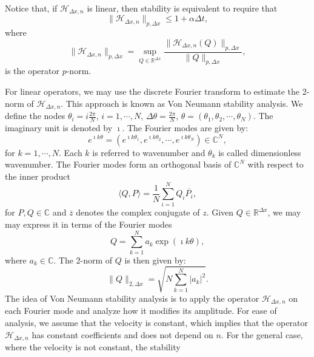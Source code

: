 Notice that, if $\mathcal{H}_{\Delta x,n}$ is linear, then stability is equivalent to require that
\begin{equation*}
	\|\mathcal{H}_{\Delta x,n}\|_{p,\Delta x} \leq 1+ \alpha \Delta t,
\end{equation*}
where
\begin{equation*}
	\|\mathcal{H}_{\Delta x,n}\|_{p,\Delta x} = \sup_{Q\in \mathbb{R}^{\Delta x}} \frac{\|\mathcal{H}_{\Delta x,n}(Q)\|_{p,\Delta x}}{\|Q\|_{p,\Delta x}},
\end{equation*}
is the operator $p$-norm.

For linear operators, we may use the discrete Fourier transform \citep{trefethen:2000}
to estimate the 2-norm of $\mathcal{H}_{\Delta x,n}$. This approach is known as Von Neumann stability analysis.
We define the nodes $\theta_i = i\frac{2\pi}{N}$, $i=1, \cdots, N$, $\Delta \theta = \frac{2\pi}{N}$,
$\theta = (\theta_1, \theta_2, \cdots, \theta_N)$.
The imaginary unit is denoted by $\imath$.
The Fourier modes are given by:
\begin{equation*}
	e^{\imath k \theta} = (e^{\imath k\theta_1}, e^{\imath k\theta_2}, \cdots, e^{\imath k\theta_N}) \in \mathbb{C}^N, 
\end{equation*}
for $k=1, \cdots, N$. 
Each $k$ is referred to wavenumber and $\theta_k$ is called  dimensionless wavenumber.
The Fourier modes form an orthogonal basis of $\mathbb{C}^N$ with respect to the 
inner product
\begin{equation*}
	\langle Q, P \rangle = \frac{1}{N}\sum_{i=1}^{N}{Q_i \overline{P_i}},
\end{equation*}
for $P, Q \in \mathbb{C}$ and $\overline{z}$ denotes the complex conjugate of $z$. 
Given $Q \in \mathbb{R}^{\Delta x}$, we may may express it in terms of the Fourier modes
\begin{equation*}
	Q = \sum_{k=1}^{N} a_k \exp(\imath k \theta),
\end{equation*}
where $a_k \in \mathbb{C}$. The 2-norm of $Q$ is then given by:
\begin{equation*}
	\|Q\|_{2,\Delta x} = \sqrt{N \sum_{k=1}^{N} |a_k|^2}.
\end{equation*}
The idea of Von Neumann stability analysis is to apply the operator $\mathcal{H}_{\Delta x,n}$ on each Fourier mode and
analyze how it modifies its amplitude.
For ease of analysis, we assume that the velocity is constant, which implies that
the operator $\mathcal{H}_{\Delta x,n}$ has constant coefficients and does not depend on $n$.
For the general case, where the velocity is not constant, the stability
